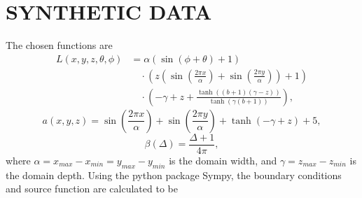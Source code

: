 \chapter{SYNTHETIC DATA}
\label{chap:mms_expressions}

The chosen functions are
\begin{align}
  L(x, y, z, \theta, \phi) &=
    \alpha \left(\sin{\left (\phi + \theta \right )} + 1\right) \nonumber\\
    &\quad\cdot \left(z \left(\sin{\left (\frac{2 \pi x}{\alpha} \right )} + \sin{\left (\frac{2 \pi y}{\alpha} \right )}\right) + 1\right) \nonumber\\
    &\quad\cdot \left(- \gamma + z + \frac{\tanh{\left (\left(b + 1\right) \left(\gamma - z\right) \right )}}{\tanh{\left (\gamma \left(b + 1\right) \right )}}\right),
  \label{eqn:mms_sol_expr}
\end{align}
\begin{equation}
  a(x, y, z) = \sin{\left (\frac{2 \pi x}{\alpha} \right )} + \sin{\left (\frac{2 \pi y}{\alpha} \right )} + \tanh{\left (- \gamma + z \right )} + 5,
  \label{eqn:mms_abs_expr}
\end{equation}
\begin{equation}
  \beta(\Delta) = \frac{\Delta + 1}{4 \pi},
  \label{eqn:mms_vsf_expr}
\end{equation}
where $\alpha=x_{max}-x_{min}=y_{max}-y_{min}$ is the domain width, and $\gamma=z_{max}-z_{min}$ is the domain depth.
Using the python package Sympy, the boundary conditions and source function are calculated to be
